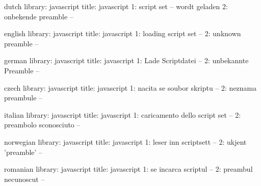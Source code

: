 



 

\unprotect


\startmessages  dutch  library: javascript
  title: javascript
      1: script set -- wordt geladen
      2: onbekende preamble --
\stopmessages

\startmessages  english  library: javascript
  title: javascript
      1: loading script set --
      2: unknown preamble --
\stopmessages

\startmessages  german  library: javascript
  title: javascript
      1: Lade Scriptdatei --
      2: unbekannte Preamble --
\stopmessages

\startmessages  czech  library: javascript
  title: javascript
      1: nacita se soubor skriptu --
      2: neznama preambule --
\stopmessages

\startmessages  italian  library: javascript
  title: javascript
      1: caricamento dello script set --
      2: preambolo sconosciuto --
\stopmessages

\startmessages  norwegian library: javascript
  title: javascript
      1: leser inn scriptsett --
      2: ukjent 'preamble' --
\stopmessages

\startmessages  romanian  library: javascript
  title: javascript
      1: se incarca scriptul --
      2: preambul necunoscut --
\stopmessages

